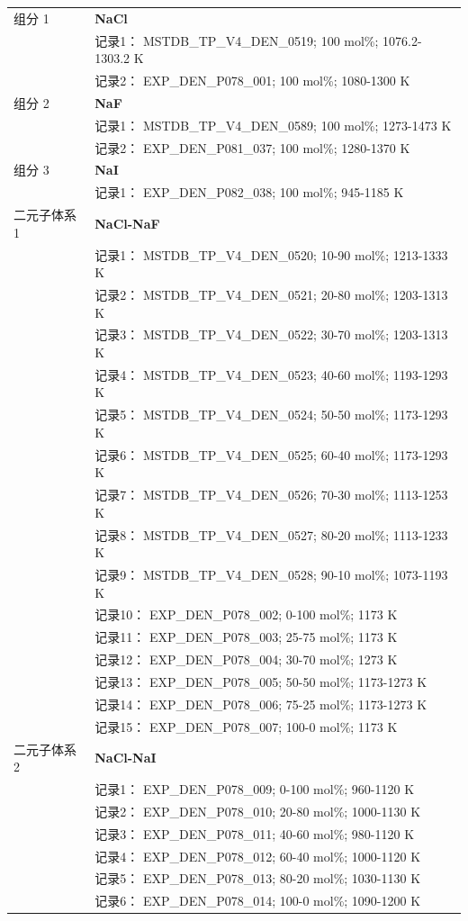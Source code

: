 \documentclass[12pt]{article}
\begin{document}
{\begin{longtable}[]{@{}
  >{\raggedright\arraybackslash}p{}
  >{\raggedright\arraybackslash}p{}@{}}
组分 1  & \textbf{NaCl} \\
 & 记录1： MSTDB\_TP\_V4\_DEN\_0519; 100 mol\%; 1076.2-1303.2 K \\
 & 记录2： EXP\_DEN\_P078\_001; 100 mol\%; 1080-1300 K  \\

组分 2  & \textbf{NaF} \\
 & 记录1： MSTDB\_TP\_V4\_DEN\_0589; 100 mol\%; 1273-1473 K \\
 & 记录2： EXP\_DEN\_P081\_037; 100 mol\%; 1280-1370 K  \\

组分 3  & \textbf{NaI} \\
 & 记录1： EXP\_DEN\_P082\_038; 100 mol\%; 945-1185 K  \\

二元子体系 1  & \textbf{NaCl-NaF} \\
 & 记录1： MSTDB\_TP\_V4\_DEN\_0520; 10-90 mol\%; 1213-1333 K \\
 & 记录2： MSTDB\_TP\_V4\_DEN\_0521; 20-80 mol\%; 1203-1313 K \\
 & 记录3： MSTDB\_TP\_V4\_DEN\_0522; 30-70 mol\%; 1203-1313 K \\
 & 记录4： MSTDB\_TP\_V4\_DEN\_0523; 40-60 mol\%; 1193-1293 K \\
 & 记录5： MSTDB\_TP\_V4\_DEN\_0524; 50-50 mol\%; 1173-1293 K \\
 & 记录6： MSTDB\_TP\_V4\_DEN\_0525; 60-40 mol\%; 1173-1293 K \\
 & 记录7： MSTDB\_TP\_V4\_DEN\_0526; 70-30 mol\%; 1113-1253 K \\
 & 记录8： MSTDB\_TP\_V4\_DEN\_0527; 80-20 mol\%; 1113-1233 K \\
 & 记录9： MSTDB\_TP\_V4\_DEN\_0528; 90-10 mol\%; 1073-1193 K \\
 & 记录10： EXP\_DEN\_P078\_002; 0-100 mol\%; 1173 K \\
 & 记录11： EXP\_DEN\_P078\_003; 25-75 mol\%; 1173 K \\
 & 记录12： EXP\_DEN\_P078\_004; 30-70 mol\%; 1273 K \\
 & 记录13： EXP\_DEN\_P078\_005; 50-50 mol\%; 1173-1273 K \\
 & 记录14： EXP\_DEN\_P078\_006; 75-25 mol\%; 1173-1273 K \\
 & 记录15： EXP\_DEN\_P078\_007; 100-0 mol\%; 1173 K  \\

二元子体系 2  & \textbf{NaCl-NaI} \\
 & 记录1： EXP\_DEN\_P078\_009; 0-100 mol\%; 960-1120 K \\
 & 记录2： EXP\_DEN\_P078\_010; 20-80 mol\%; 1000-1130 K \\
 & 记录3： EXP\_DEN\_P078\_011; 40-60 mol\%; 980-1120 K \\
 & 记录4： EXP\_DEN\_P078\_012; 60-40 mol\%; 1000-1120 K \\
 & 记录5： EXP\_DEN\_P078\_013; 80-20 mol\%; 1030-1130 K \\
 & 记录6： EXP\_DEN\_P078\_014; 100-0 mol\%; 1090-1200 K  \\


\end{longtable}}
\end{document}
